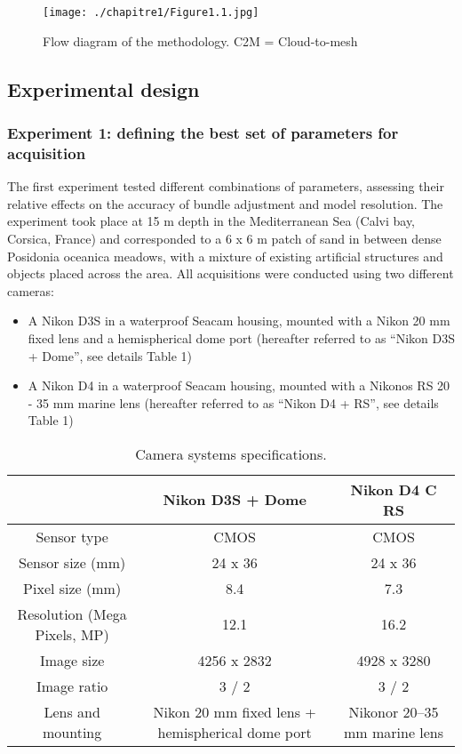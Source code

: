 \begin{figure}[H]
	\begin{center}
	\texttt{[image: ./chapitre1/Figure1.1.jpg]}
		\caption{Flow diagram of the methodology. C2M = Cloud-to-mesh}
	\label{fig1.1}
\end{center}
\end{figure}

\subsection{Experimental design}\label{chapitre1_2.1}

\subsubsection{Experiment 1: defining the best set of parameters for acquisition}\label{chapitre1_2.1.1}

The first experiment tested different combinations of parameters, assessing their relative effects on the accuracy of bundle adjustment and model resolution. The experiment took place at 15 m depth in the Mediterranean Sea (Calvi bay, Corsica, France) and corresponded to a 6 x 6 m patch of sand in between dense Posidonia oceanica meadows, with a mixture of existing artificial structures and objects placed across the area. All acquisitions were conducted using two different cameras: 

\begin{itemize}[leftmargin=*]
\item A Nikon D3S in a waterproof Seacam housing, mounted with a Nikon 20 mm fixed lens and a hemispherical dome port (hereafter referred to as “Nikon D3S + Dome”, see details Table 1)
\item A Nikon D4 in a waterproof Seacam housing, mounted with a Nikonos RS 20 - 35 mm marine lens (hereafter referred to as “Nikon D4 + RS”, see details Table 1)
\end{itemize}

\begin{table}[H]
\caption{Camera systems specifications.}\label{tab1.1}
\centering
\begin{tabular}{ccc}
\toprule
\textbf{}	& \textbf{Nikon D3S + Dome}	& \textbf{Nikon D4 C RS}\\
\midrule
Sensor type		& CMOS			& CMOS\\
Sensor size (mm)		& 24 x 36			& 24 x 36\\
Pixel size (mm)     & 8.4       & 7.3\\
Resolution (Mega Pixels, MP)		& 12.1			& 16.2\\
Image size		& 4256 x 2832			& 4928 x 3280\\
Image ratio		& 3 / 2			& 3 / 2\\
Lens and mounting		& Nikon 20 mm fixed lens + hemispherical
dome port			& Nikonor 20–35 mm marine lens\\
\bottomrule
\end{tabular}
\end{table}

